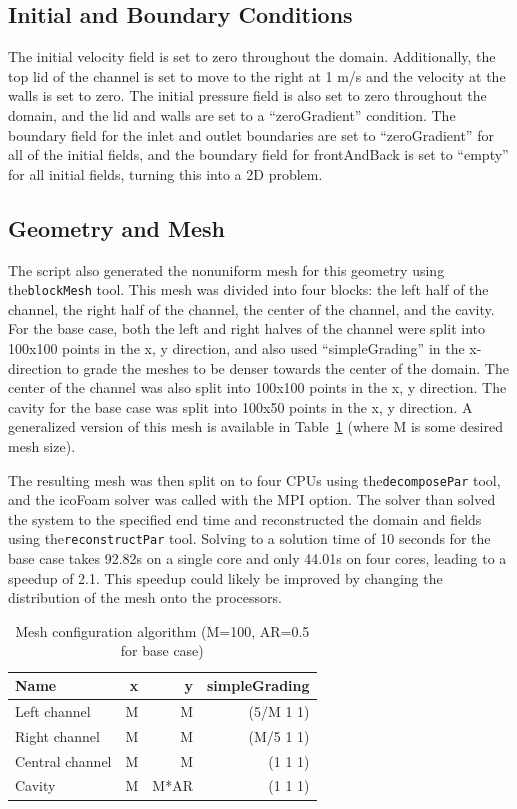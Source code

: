 \documentclass[twocolumn,10pt]{asme2ej}
\begin{document}
\subsection{Initial and Boundary Conditions}
The initial velocity field is set to zero throughout the domain. Additionally, the top lid of the channel is set to move to the right at 1 m/s and the velocity at the walls is set to zero. The initial pressure field is also set to zero throughout the domain, and the lid and walls are set to a ``zeroGradient'' condition. The boundary field for the inlet and outlet boundaries are set to ``zeroGradient'' for all of the initial fields, and the boundary field for frontAndBack is set to ``empty'' for all initial fields, turning this into a 2D problem.

\subsection{Geometry and Mesh}
The script also generated the nonuniform mesh for this geometry using the\lstinline{blockMesh} tool. This mesh was divided into four blocks: the left half of the channel, the right half of the channel, the center of the channel, and the cavity. For the base case, both the left and right halves of the channel were split into 100x100 points in the x, y direction, and also used ``simpleGrading'' in the x-direction to grade the meshes to be denser towards the center of the domain. The center of the channel was also split into 100x100 points in the x, y direction. The cavity for the base case was split into 100x50 points in the x, y direction. A generalized version of this mesh is available in Table~\ref{mesh_generation} (where M is some desired mesh size).

The resulting mesh was then split on to four CPUs using the\lstinline{decomposePar} tool, and the icoFoam solver was called with the MPI option. The solver than solved the system to the specified end time and reconstructed the domain and fields using the\lstinline{reconstructPar} tool. Solving to a solution time of 10 seconds for the base case takes 92.82s on a single core and only 44.01s on four cores, leading to a speedup of 2.1. This speedup could likely be improved by changing the distribution of the mesh onto the processors.

\begin{table}[tb]
\begin{center}
\begin{tabular}{| l | r r r | }
\hline
Name            & x &  y    & simpleGrading \\
\hline
Left channel    & M &  M    & (5/M 1 1) \\
Right channel   & M &  M    & (M/5 1 1) \\
Central channel & M &  M    & (1   1 1) \\
Cavity          & M &  M*AR & (1   1 1) \\
\hline
\end{tabular}
\caption{Mesh configuration algorithm (M=100, AR=0.5 for base case)}
\label{mesh_generation}
\end{center}
\end{table}
\end{document}
